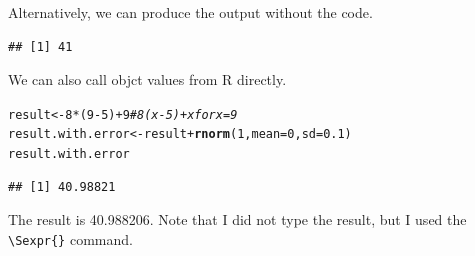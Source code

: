 \documentclass{article}\usepackage[]{graphicx}\usepackage[]{xcolor}
\makeatletter
\newcommand{\hlnum}[1]{\textcolor[rgb]{0.686,0.059,0.569}{#1}}%
\newcommand{\hlcom}[1]{\textcolor[rgb]{0.678,0.584,0.686}{\textit{#1}}}%
\newcommand{\hlopt}[1]{\textcolor[rgb]{0,0,0}{#1}}%
\newcommand{\hldef}[1]{\textcolor[rgb]{0.345,0.345,0.345}{#1}}%
\newcommand{\hlkwb}[1]{\textcolor[rgb]{0.69,0.353,0.396}{#1}}%
\newcommand{\hlkwc}[1]{\textcolor[rgb]{0.333,0.667,0.333}{#1}}%
\newcommand{\hlkwd}[1]{\textcolor[rgb]{0.737,0.353,0.396}{\textbf{#1}}}%
\newenvironment{kframe}{%
 \def\at@end@of@kframe{}%
 \ifinner\ifhmode%
  \def\at@end@of@kframe{\end{minipage}}%
  \begin{minipage}{\columnwidth}%
 \fi\fi%
 \def\FrameCommand##1{\hskip\@totalleftmargin \hskip-\fboxsep
 \colorbox{shadecolor}{##1}\hskip-\fboxsep
     \hskip-\linewidth \hskip-\@totalleftmargin \hskip\columnwidth}%
 \MakeFramed {\advance\hsize-\width
   \@totalleftmargin\z@ \linewidth\hsize
   \@setminipage}}%
 {\par\unskip\endMakeFramed%
 \at@end@of@kframe}
\newenvironment{knitrout}{}{} %
\makeatother
\begin{document}
\begin{multicols}{2}
Alternatively, we can produce the output without the code.
\begin{knitrout}\scriptsize
{}\color{fgcolor}\begin{kframe}
\begin{verbatim}
## [1] 41
\end{verbatim}
\end{kframe}
\end{knitrout}

We can also call objct values from R directly.
\begin{knitrout}\scriptsize
{}\color{fgcolor}\begin{kframe}
\begin{alltt}
\hldef{result} \hlkwb{<-} \hlnum{8}\hlopt{*}\hldef{(}\hlnum{9}\hlopt{-}\hlnum{5}\hldef{)} \hlopt{+} \hlnum{9}   \hlcom{# 8(x-5) + x for x = 9}
\hldef{result.with.error} \hlkwb{<-} \hldef{result} \hlopt{+} \hlkwd{rnorm}\hldef{(}\hlnum{1}\hldef{,} \hlkwc{mean} \hldef{=} \hlnum{0}\hldef{,} \hlkwc{sd} \hldef{=} \hlnum{0.1}\hldef{)}
\hldef{result.with.error}
\end{alltt}
\begin{verbatim}
## [1] 40.98821
\end{verbatim}
\end{kframe}
\end{knitrout}

The result is 40.988206. Note that I did not type the result, but I used the \verb|\Sexpr{}| command.


\end{multicols}
\end{document}

